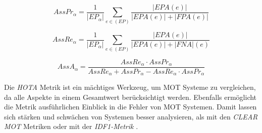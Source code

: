 \begin{equation}
    \label{eq:AssPr}
    AssPr_{\alpha} =  \frac{1}{|EP_{\alpha}|} \sum_{e \in (EP)} \frac{|EPA(e)|}{|EPA(e)| + |FPA(e)|}
\end{equation}

\begin{equation}
    \label{eq:AssRe}
    AssRe_{\alpha} = \frac{1}{|EP_{\alpha}|} \sum_{e \in (EP)} \frac{|EPA(e)|}{|EPA(e)| + |FNA|(e)}
\end{equation}

\begin{equation}
    \label{eq:AssAfromPrRe}
    AssA_{\alpha} = \frac{AssRe_{\alpha} \cdot AssPr_{\alpha} }{AssRe_{\alpha} + AssPr_{\alpha} - AssRe_{\alpha} \cdot AssPr_{\alpha}}
\end{equation}

Die \textit{\gls{HOTA}} Metrik ist ein mächtiges Werkzeug, um \gls{MOT} Systeme zu vergleichen, da alle Aspekte in einem Gesamtwert berücksichtigt werden. Ebenfalls ermöglicht die Metrik ausführlichen Einblick in die Fehler von \gls{MOT} Systemen. Damit lassen sich stärken und schwächen von Systemen besser analysieren, als mit den \textit{\acrshort{CLEAR} \gls{MOT}} Metriken oder mit der \textit{\gls{IDF1}-Metrik} \cite{HOTA}. 